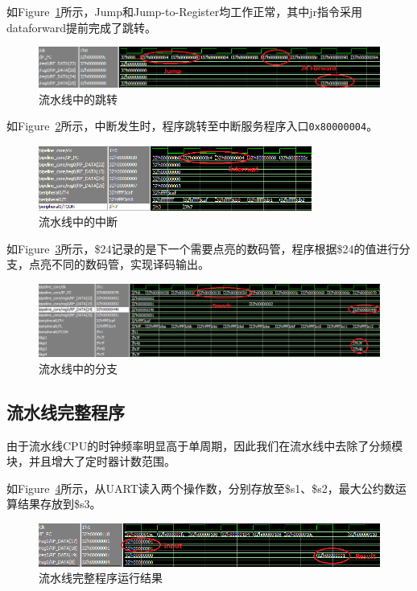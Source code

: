 \documentclass{article}
\begin{document}
            如Figure~\ref{fig:pipeline_digitest1}所示，Jump和Jump-to-Register均工作正常，其中jr指令采用dataforward提前完成了跳转。
            \begin{figure}[H]
                \centering
                \includegraphics[width=\textwidth]{images/pipeline_digitest1.png}
                \caption{\label{fig:pipeline_digitest1}流水线中的跳转}
            \end{figure}
            如Figure~\ref{fig:pipeline_digitest2}所示，中断发生时，程序跳转至中断服务程序入口\texttt{0x80000004}。
            \begin{figure}[H]
                \centering
                \includegraphics[width=0.8\textwidth]{images/pipeline_digitest2.png}
                \caption{\label{fig:pipeline_digitest2}流水线中的中断}
            \end{figure}
            如Figure~\ref{fig:pipeline_digitest3}所示，\$24记录的是下一个需要点亮的数码管，程序根据\$24的值进行分支，点亮不同的数码管，实现译码输出。
            \begin{figure}[H]
                \centering
                \includegraphics[width=\textwidth]{images/pipeline_digitest3.png}
                \caption{\label{fig:pipeline_digitest3}流水线中的分支}
            \end{figure}
        
        \subsection{流水线完整程序}
            由于流水线CPU的时钟频率明显高于单周期，因此我们在流水线中去除了分频模块，并且增大了定时器计数范围。
            
            如Figure~\ref{fig:pipeline_full}所示，从UART读入两个操作数，分别存放至\$s1、\$s2，最大公约数运算结果存放到\$s3。
            \begin{figure}[H]
                \centering
                \includegraphics[width=\textwidth]{images/pipeline_full.png}
                \caption{\label{fig:pipeline_full}流水线完整程序运行结果}
            \end{figure}
            
\end{document}
